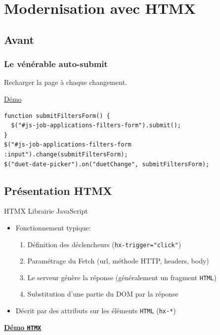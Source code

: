 \documentclass{beamer}
\begin{document}
\section{Modernisation avec HTMX}

\subsection*{Avant}

\begin{frame}[fragile]
    \frametitle{Le vénérable auto-submit}

    Recharger la page à chaque changement.

    \href{http://localhost:8001/}{Démo}
    \begin{verbatim}
function submitFiltersForm() {
  $("#js-job-applications-filters-form").submit();
}
$("#js-job-applications-filters-form :input").change(submitFiltersForm);
$("duet-date-picker").on("duetChange", submitFiltersForm);
    \end{verbatim}
\end{frame}

\subsection*{Présentation HTMX}

\begin{frame}{HTMX}
    Librairie JavaScript
    \begin{itemize}
        \item Fonctionnement typique:
            \begin{enumerate}
                \item Définition des déclencheurs (\texttt{hx-trigger="click"})
                \item Paramétrage du Fetch (url, méthode HTTP, headers, body)
                \item Le serveur génère la réponse (généralement un fragment \texttt{HTML})
                \item Substitution d'une partie du DOM par la réponse
            \end{enumerate}
        \item Décrit par des attributs sur les éléments \texttt{HTML} (\texttt{hx-*})
    \end{itemize}

    \vspace{0.5cm}

    \href{https://htmx.org/examples/click-to-edit/}{\textbf{Démo \texttt{HTMX}}}
\end{frame}
\end{document}
